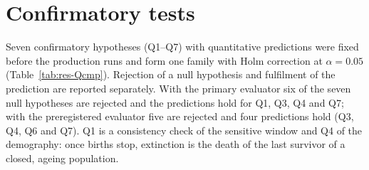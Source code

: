 \documentclass[preprint,12pt,authoryear]{elsarticle}
\begin{document}
\section{Confirmatory tests}
\label{supp:Q}

Seven confirmatory hypotheses (Q1--Q7) with quantitative predictions were fixed before the production runs and form
one family with Holm correction \citep{Holm1979} at $\alpha=0.05$ (Table~\ref{tab:res-Qcmp}). Rejection of a null
hypothesis and fulfilment of the prediction are reported separately. With the primary evaluator six of the seven
null hypotheses are rejected and the predictions hold for Q1, Q3, Q4 and Q7; with the preregistered evaluator five
are rejected and four predictions hold (Q3, Q4, Q6 and Q7). Q1 is a consistency check of the sensitive window and Q4
of the demography: once births stop, extinction is the death of the last survivor of a closed, ageing population.

\begin{table}[ht]
\centering
\caption{The confirmatory family with the primary evaluator (left) and with the preregistered evaluator (right), on
the same runs. Holm correction over seven tests within each column set; the $p$ of Q6 is quasi-binomial. The
preregistered evaluator takes the transplant of Q1 at $1.75\,t_{\rm pk}$ with $t_{\rm pk}=\arg\max N$, as
preregistered. Q1: structural irreversibility (paired cross-transplant, exact McNemar); Q2: each rule necessary
(intersection--union test over the single ablations); Q3: near-deterministic collapse against the short-lived control; Q4:
phase-D law, slope of $T_{\rm ext}-t_{\rm last}$ on $a_{\max}$ (TOST, margins $[0.8,1.25]$); Q5: O13 band centred
at $n^*\approx m_c$ (Firth regression, $b_2<0$); Q6: $a_w$ weighs less than $r$ (profile likelihood, $0<\theta<1$);
Q7: endogenous collapse at $\gamma=0$ in the subcritical corner.}
\label{tab:res-Qcmp}
\scriptsize
\setlength{\tabcolsep}{3pt}
\end{table}
\end{document}
